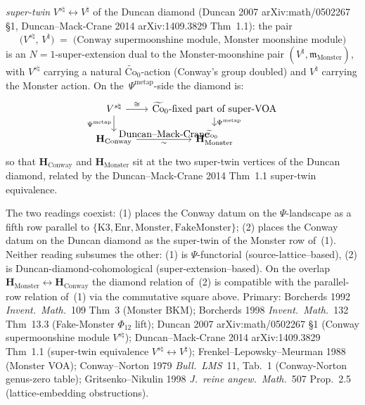 \begin{theorem}
\begin{enumerate}
\emph{super-twin}
$V^{s\natural}\leftrightarrow V^\natural$
of the Duncan diamond
\textup{(}Duncan 2007 arXiv:math/0502267 \S 1, Duncan--Mack-Crane 2014
arXiv:1409.3829 Thm~1.1\textup{)}: the pair
\[
 \bigl(V^{s\natural},\, V^\natural\bigr)
 \;=\;
 \bigl(\text{Conway supermoonshine module},\,
 \text{Monster moonshine module}\bigr)
\]
is an $N = 1$-super-extension dual to the Monster-moonshine
pair $(V^\natural,\mathfrak{m}_{\mathrm{Monster}})$, with
$V^{s\natural}$ carrying a natural $\widetilde{\mathrm{Co}}_0$-action
(Conway's group doubled) and $V^\natural$ carrying the Monster
action. On the~$\Psi^{\mathrm{metap}}$-side the diamond is:
\[
 \begin{tikzcd}[column sep=small, row sep=small]
 V^{s\natural} \arrow[r, "\cong"] \arrow[d, "\Psi^{\mathrm{metap}}", swap]
 & \widetilde{\mathrm{Co}}_0\text{-fixed part of super-VOA}
 \arrow[d, "\Psi^{\mathrm{metap}}"] \\
 \mathbf{H}_{\mathrm{Conway}} \arrow[r, "\hbox{Duncan--Mack-Crane}", "\sim"']
 & \mathbf{H}_{\mathrm{Monster}}^{\widetilde{\mathrm{Co}}_0}
 \end{tikzcd}
\]
so that $\mathbf{H}_{\mathrm{Conway}}$ and $\mathbf{H}_{\mathrm{Monster}}$
sit at the two super-twin vertices of the Duncan diamond, related by
the Duncan--Mack-Crane 2014 Thm~1.1 super-twin equivalence.
\end{enumerate}
The two readings coexist: \textup{(1)} places the Conway datum on
the $\Psi$-landscape as a fifth row parallel to
$\{\mathrm{K3},\mathrm{Enr},\mathrm{Monster},\mathrm{FakeMonster}\}$;
\textup{(2)} places the Conway datum on the Duncan diamond as the
super-twin of the Monster row of~\textup{(1)}. Neither reading
subsumes the other: \textup{(1)} is $\Psi$-functorial
(source-lattice--based), \textup{(2)} is Duncan-diamond-cohomological
(super-extension--based). On the overlap
$\mathbf{H}_{\mathrm{Monster}}\leftrightarrow\mathbf{H}_{\mathrm{Conway}}$
the diamond relation of~\textup{(2)} is compatible with the
parallel-row relation of~\textup{(1)} via the commutative square
above.
Primary:
Borcherds 1992 \emph{Invent.~Math.}~109 Thm~3 (Monster BKM);
Borcherds 1998 \emph{Invent.~Math.}~132 Thm~13.3
(Fake-Monster $\Phi_{12}$ lift);
Duncan 2007 arXiv:math/0502267 \S 1 (Conway supermoonshine module
$V^{s\natural}$);
Duncan--Mack-Crane 2014 arXiv:1409.3829 Thm~1.1
(super-twin equivalence $V^{s\natural}\leftrightarrow V^\natural$);
Frenkel--Lepowsky--Meurman 1988 (Monster VOA);
Conway--Norton 1979 \emph{Bull.~LMS}~11, Tab.~1
(Conway-Norton genus-zero table);
Gritsenko--Nikulin 1998 \emph{J.~reine angew.~Math.}~507 Prop.~2.5
(lattice-embedding obstructions).
\end{theorem}

